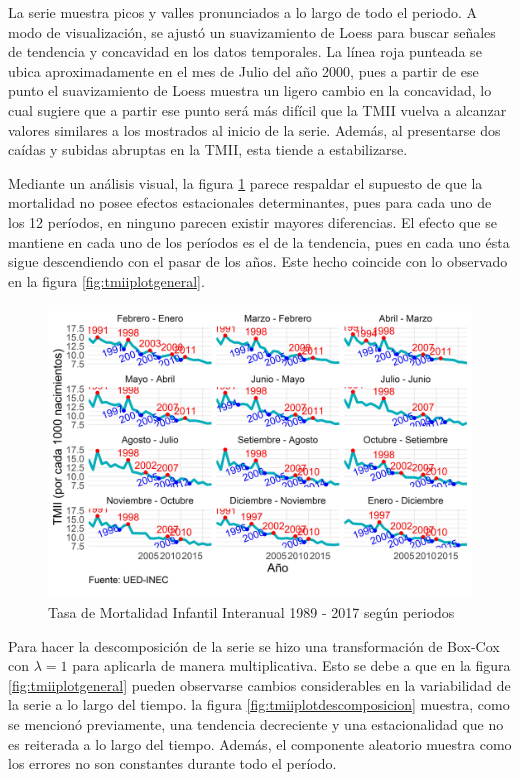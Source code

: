 \documentclass[
]{article}
\begin{document}
La serie muestra picos y valles pronunciados a lo largo de todo el
periodo. A modo de visualización, se ajustó un suavizamiento de Loess
para buscar señales de tendencia y concavidad en los datos temporales.
La línea roja punteada se ubica aproximadamente en el mes de Julio del
año 2000, pues a partir de ese punto el suavizamiento de Loess muestra
un ligero cambio en la concavidad, lo cual sugiere que a partir ese
punto será más difícil que la TMII vuelva a alcanzar valores similares a
los mostrados al inicio de la serie. Además, al presentarse dos caídas y
subidas abruptas en la TMII, esta tiende a estabilizarse.

Mediante un análisis visual, la figura \ref{fig:tmiiplotperiodos} parece
respaldar el supuesto de que la mortalidad no posee efectos estacionales
determinantes, pues para cada uno de los 12 períodos, en ninguno parecen
existir mayores diferencias. El efecto que se mantiene en cada uno de
los períodos es el de la tendencia, pues en cada uno ésta sigue
descendiendo con el pasar de los años. Este hecho coincide con lo
observado en la figura \ref{fig:tmiiplotgeneral}.

\begin{figure}[!h]
\includegraphics[width=1\linewidth,height=1\textheight]{Tesis_files/figure-latex/tmiiplotperiodos-1} \caption{Tasa de Mortalidad Infantil Interanual 1989 - 2017 según periodos}\label{fig:tmiiplotperiodos}
\end{figure}

Para hacer la descomposición de la serie se hizo una transformación de
Box-Cox con \(\lambda=1\) para aplicarla de manera multiplicativa. Esto
se debe a que en la figura \ref{fig:tmiiplotgeneral} pueden observarse
cambios considerables en la variabilidad de la serie a lo largo del
tiempo. la figura \ref{fig:tmiiplotdescomposicion} muestra, como se
mencionó previamente, una tendencia decreciente y una estacionalidad que
no es reiterada a lo largo del tiempo. Además, el componente aleatorio
muestra como los errores no son constantes durante todo el período.
\end{document}
